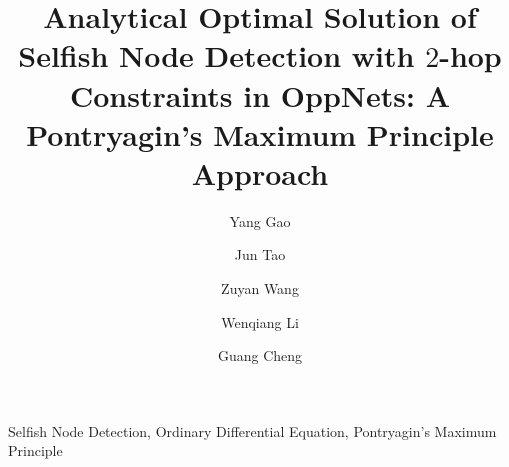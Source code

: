 \documentclass[conference]{IEEEtran}
\begin{document}
\title{Analytical Optimal Solution of Selfish Node Detection with $2$-hop Constraints in OppNets: A Pontryagin's Maximum Principle Approach
}
\author[1,2]{Yang Gao}
\author[1,2]{Jun Tao}
\author[1,2]{Zuyan Wang}
\author[1]{Wenqiang Li}
\author[1,2]{Guang Cheng}




\maketitle



\begin{IEEEkeywords}
Selfish Node Detection, Ordinary Differential Equation,
Pontryagin's Maximum Principle
\end{IEEEkeywords}











\end{document}
